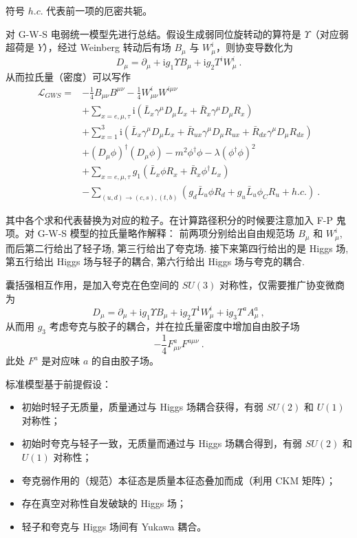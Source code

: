 
\begin{issues}
\issueMissDepend
\issueAbstract
\end{issues}

符号 $h.c.$ 代表前一项的厄密共轭。

对 G-W-S 电弱统一模型先进行总结。假设生成弱同位旋转动的算符是 $\Upsilon$（对应弱超荷是 $Y$），经过 Weinberg 转动后有场 $B_\mu$ 与 $W^i_\mu$，则协变导数化为 
\begin{equation}
D_\mu = \partial_\mu + \mathrm i g_1 \Upsilon B_\mu + \mathrm i g_2 T^i W_\mu^i~.
\end{equation}
从而拉氏量（密度）可以写作 
\begin{equation}
	\begin{aligned}
		\mathcal L_{GWS} =& -\frac{1}{4} B_{\mu\nu} B^{\mu\nu} - \frac{1}{4} W_{\mu\nu}^i W^{i\mu\nu}\\
		&+ \sum_{x = e, \mu, \tau} \mathrm i \left(\bar{L}_x \gamma^\mu D_\mu L_x + \bar{R}_x \gamma^\mu D_\mu R_x\right)\\
		&+ \sum_{x=1}^3 \mathrm i \left(\bar{L}_{x} \gamma^\mu D_\mu L_x + \bar{R}_{ux} \gamma^\mu D_\mu R_{ux} + \bar{R}_{dx} \gamma^\mu D_\mu R_{dx}\right) \\
		&+(D_\mu \phi)^\dagger (D_\mu \phi) - m^2 \phi^\dagger \phi - \lambda (\phi^\dagger \phi)^2 \\
		&+ \sum_{x = e, \mu, \tau} g_1 \left(\bar{L}_x \phi R_x + \bar{R}_x \phi^\dagger L_x\right) \\
		&- \sum_{(u, d) \to (c, s), (t, b)} \left(g_d \bar{L}_u \phi R_d + g_u \bar{L}_u \phi_C R_u + h.c.\right) ~.
	\end{aligned}
\end{equation}

其中各个求和代表替换为对应的粒子。在计算路径积分的时候要注意加入 F-P 鬼项。对 G-W-S 模型的拉氏量略作解释：
前两项分别给出自由规范场 $B_\mu$ 和 $W_\mu^i$, 而后第二行给出了轻子场, 第三行给出了夸克场.
接下来第四行给出的是 Higgs 场, 第五行给出 Higgs 场与轻子的耦合, 第六行给出 Higgs 场与夸克的耦合.

囊括强相互作用，是加入夸克在色空间的 $SU(3)$ 对称性，仅需要推广协变微商为 
\begin{equation}
	D_\mu = \partial_\mu + \mathrm i g_1 \Upsilon B_\mu + \mathrm i g_2 T^1 W_\mu^i + \mathrm i g_3 T^a A^a_\mu ~,
\end{equation}
从而用 $g_3$ 考虑夸克与胶子的耦合，并在拉氏量密度中增加自由胶子场
\begin{equation}
	-\frac14 F_{\mu\nu}^a F^{a\mu\nu} ~.
\end{equation}
此处 $F^a$ 是对应味 $a$ 的自由胶子场。

标准模型基于前提假设：
\begin{itemize}
	\item 初始时轻子无质量，质量通过与 Higgs 场耦合获得，有弱 $SU(2)$ 和 $U(1)$ 对称性；
	\item 初始时夸克与轻子一致，无质量而通过与 Higgs 场耦合得到，有弱 $SU(2)$ 和 $U(1)$ 对称性；
	\item 夸克弱作用的（规范）本征态是质量本征态叠加而成（利用 CKM 矩阵）；
	\item 存在真空对称性自发破缺的 Higgs 场；
	\item 轻子和夸克与 Higgs 场间有 Yukawa 耦合。
\end{itemize}